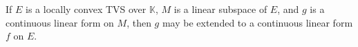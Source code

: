 If $E$ is a locally convex TVS over $\mathbb{K}$, $M$ is a linear subspace of $E$, and $g$ is a continuous linear form on $M$, then $g$ may be extended to a continuous linear form $f$ on $E$.